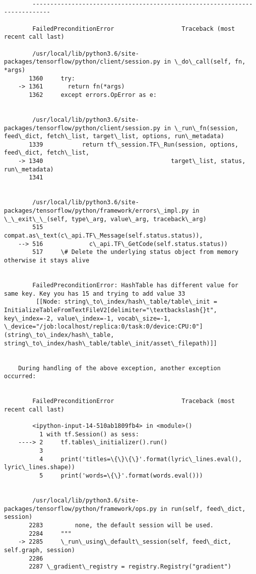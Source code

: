 \documentclass[11pt]{article}
\begin{document}
    \begin{Verbatim}[commandchars=\\\{\}]

        ---------------------------------------------------------------------------

        FailedPreconditionError                   Traceback (most recent call last)

        /usr/local/lib/python3.6/site-packages/tensorflow/python/client/session.py in \_do\_call(self, fn, *args)
       1360     try:
    -> 1361       return fn(*args)
       1362     except errors.OpError as e:


        /usr/local/lib/python3.6/site-packages/tensorflow/python/client/session.py in \_run\_fn(session, feed\_dict, fetch\_list, target\_list, options, run\_metadata)
       1339           return tf\_session.TF\_Run(session, options, feed\_dict, fetch\_list,
    -> 1340                                    target\_list, status, run\_metadata)
       1341 


        /usr/local/lib/python3.6/site-packages/tensorflow/python/framework/errors\_impl.py in \_\_exit\_\_(self, type\_arg, value\_arg, traceback\_arg)
        515             compat.as\_text(c\_api.TF\_Message(self.status.status)),
    --> 516             c\_api.TF\_GetCode(self.status.status))
        517     \# Delete the underlying status object from memory otherwise it stays alive


        FailedPreconditionError: HashTable has different value for same key. Key you has 15 and trying to add value 33
    	 [[Node: string\_to\_index/hash\_table/table\_init = InitializeTableFromTextFileV2[delimiter="\textbackslash{}t", key\_index=-2, value\_index=-1, vocab\_size=-1, \_device="/job:localhost/replica:0/task:0/device:CPU:0"](string\_to\_index/hash\_table, string\_to\_index/hash\_table/table\_init/asset\_filepath)]]

        
    During handling of the above exception, another exception occurred:


        FailedPreconditionError                   Traceback (most recent call last)

        <ipython-input-14-510ab1809fb4> in <module>()
          1 with tf.Session() as sess:
    ----> 2     tf.tables\_initializer().run()
          3 
          4     print('titles=\{\}\{\}'.format(lyric\_lines.eval(), lyric\_lines.shape))
          5     print('words=\{\}'.format(words.eval()))


        /usr/local/lib/python3.6/site-packages/tensorflow/python/framework/ops.py in run(self, feed\_dict, session)
       2283         none, the default session will be used.
       2284     """
    -> 2285     \_run\_using\_default\_session(self, feed\_dict, self.graph, session)
       2286 
       2287 \_gradient\_registry = registry.Registry("gradient")



\end{Verbatim}
\end{document}
